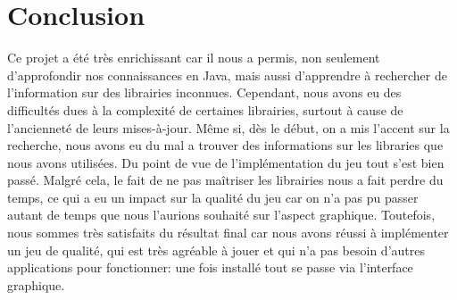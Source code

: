 \section{Conclusion}
\label{sec:conclusion}

Ce projet a été très enrichissant car il nous a permis, non seulement d'approfondir nos connaissances en Java, mais aussi d'apprendre à rechercher de
l'information sur des librairies inconnues. Cependant, nous avons eu des difficultés dues à la complexité de certaines librairies, surtout à cause de l'ancienneté de leurs mises-à-jour. Même si, dès le début,
on a mis l'accent sur la recherche, nous avons eu du mal a trouver des informations sur les libraries que nous avons utilisées. Du point de vue de
l'implémentation du jeu tout s'est bien passé. Malgré cela, le fait de ne pas maîtriser les librairies nous a fait perdre du temps, ce qui a eu un impact sur la
qualité du jeu car on n'a pas pu passer autant de temps que nous l'aurions souhaité sur l'aspect graphique. Toutefois, nous sommes très satisfaits du résultat final car nous
avons réussi à implémenter un jeu de qualité, qui est très agréable à jouer et qui n'a pas besoin d'autres applications pour fonctionner: une fois installé
tout se passe via l'interface graphique.


